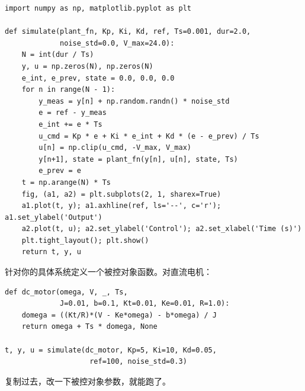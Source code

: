 \begin{verbatim}
import numpy as np, matplotlib.pyplot as plt

def simulate(plant_fn, Kp, Ki, Kd, ref, Ts=0.001, dur=2.0,
             noise_std=0.0, V_max=24.0):
    N = int(dur / Ts)
    y, u = np.zeros(N), np.zeros(N)
    e_int, e_prev, state = 0.0, 0.0, 0.0
    for n in range(N - 1):
        y_meas = y[n] + np.random.randn() * noise_std
        e = ref - y_meas
        e_int += e * Ts
        u_cmd = Kp * e + Ki * e_int + Kd * (e - e_prev) / Ts
        u[n] = np.clip(u_cmd, -V_max, V_max)
        y[n+1], state = plant_fn(y[n], u[n], state, Ts)
        e_prev = e
    t = np.arange(N) * Ts
    fig, (a1, a2) = plt.subplots(2, 1, sharex=True)
    a1.plot(t, y); a1.axhline(ref, ls='--', c='r'); a1.set_ylabel('Output')
    a2.plot(t, u); a2.set_ylabel('Control'); a2.set_xlabel('Time (s)')
    plt.tight_layout(); plt.show()
    return t, y, u
\end{verbatim}

针对你的具体系统定义一个被控对象函数。对直流电机：

\begin{verbatim}
def dc_motor(omega, V, _, Ts,
             J=0.01, b=0.1, Kt=0.01, Ke=0.01, R=1.0):
    domega = ((Kt/R)*(V - Ke*omega) - b*omega) / J
    return omega + Ts * domega, None

t, y, u = simulate(dc_motor, Kp=5, Ki=10, Kd=0.05,
                    ref=100, noise_std=0.3)
\end{verbatim}

复制过去，改一下被控对象参数，就能跑了。

